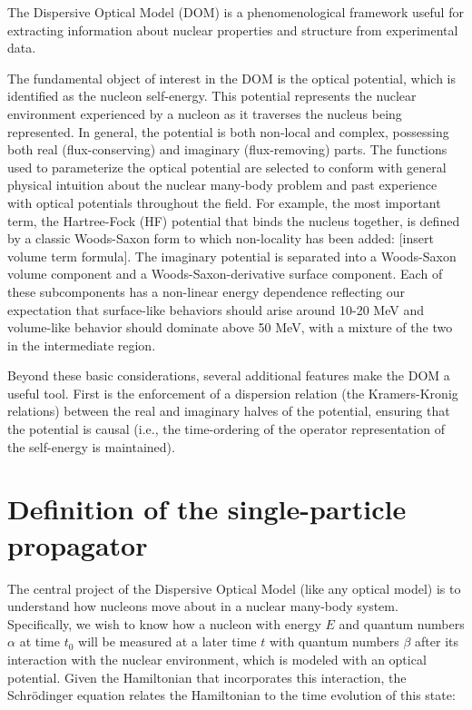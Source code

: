 The Dispersive Optical Model (DOM) is a phenomenological framework useful for 
extracting information about nuclear properties and structure from experimental
data.

The fundamental object of interest in the DOM is the \Gls{optical potential},
which is identified as the \Gls{nucleon self-energy}. This potential represents
the nuclear environment experienced
by a nucleon as it traverses the nucleus being represented. In general, the
potential is both non-local and complex, possessing both real (flux-conserving)
and imaginary (flux-removing) parts. The functions used to parameterize the optical potential
are selected to conform with general physical intuition about the nuclear
many-body problem and past experience with optical potentials throughout the
field. For example, the most important term, the Hartree-Fock (HF) potential
that binds the nucleus together, is defined by a classic Woods-Saxon form to
which non-locality has been added: [insert volume term formula]. The imaginary
potential is separated into a Woods-Saxon volume component and a
Woods-Saxon-derivative surface component. Each of these subcomponents has
a non-linear energy dependence reflecting our expectation that surface-like
behaviors should arise around 10-20 MeV and volume-like behavior should dominate
above 50 MeV, with a mixture of the two in the intermediate region.

Beyond these basic considerations, several additional features make the 
DOM a useful tool. First is the enforcement of a
dispersion relation (the Kramers-Kronig relations) between the real and imaginary
halves of the potential, ensuring that the potential is causal (i.e., the
time-ordering of the operator representation of the self-energy is maintained).

\section{Definition of the single-particle propagator}
The central project of the Dispersive Optical Model (like any optical model) is
to understand how nucleons move about in a nuclear many-body system. Specifically,
we wish to know
how a nucleon with energy $E$ and quantum numbers $\alpha$
at time $t_{0}$ will be measured at a
later time $t$ with quantum numbers $\beta$ after its interaction with the
nuclear environment, which is modeled with an optical potential. Given the
Hamiltonian that incorporates this interaction, the Schr\"odinger equation
relates the Hamiltonian to the time evolution of this state:

